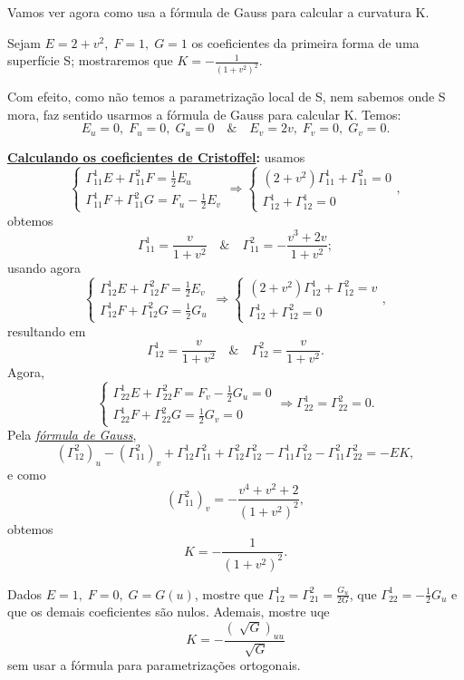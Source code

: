 \documentclass[../differential_geometry.tex]{subfiles}
\begin{document}
Vamos ver agora como usa a fórmula de Gauss para calcular a curvatura K.
\begin{example}
	Sejam \(E=2+v^{2},\; F = 1,\; G=1\) os coeficientes da primeira forma de uma superfície S; mostraremos que \(K = - \frac{1}{(1+v^{2})^{2}}\).

	Com efeito, como não temos a parametrização local de S, nem sabemos onde S mora, faz sentido usarmos a fórmula de Gauss para calcular K. Temos:
	\[
		E_{u}=0,\; F_{u}=0,\; G_{u}=0 \quad\&\quad E_{v}=2v,\; F_{v}=0,\; G_{v}=0.
	\]

	\textbf{\underline{Calculando os coeficientes de Cristoffel}:} usamos
	\[
		\left\{\begin{array}{ll}
			\Gamma_{11}^{1}E + \Gamma_{11}^{2}F = \frac{1}{2}E_{u} \\
			\Gamma_{11}^{1}F + \Gamma_{11}^{2}G = F_{u}-\frac{1}{2}E_{v}
		\end{array}\right.\Rightarrow \left\{\begin{array}{ll}
			(2+v^{2})\Gamma_{11}^{1} + \Gamma_{11}^{2} = 0 \\
			\Gamma_{12}^{1} + \Gamma_{12}^{1}=0
		\end{array}\right.,
	\]
	obtemos
	\[
		\Gamma_{11}^{1} = \frac{v}{1+v^{2}} \quad\&\quad \Gamma_{11}^{2} = -\frac{v^{3}+2v}{1+v^{2}};
	\]
	usando agora
	\[
		\left\{\begin{array}{ll}
			\Gamma_{12}^{1}E + \Gamma_{12}^{2} F = \frac{1}{2}E_{v} \\
			\Gamma_{12}^{1}F + \Gamma_{12}^{2}G = \frac{1}{2}G_{u}
		\end{array}\right. \Rightarrow \left\{\begin{array}{ll}
			(2+v^{2})\Gamma_{12}^{1} + \Gamma_{12}^{2} = v \\
			\Gamma_{12}^{1} + \Gamma_{12}^{2}=0
		\end{array}\right.,
	\]
	resultando em
	\[
		\Gamma_{12}^{1} = \frac{v}{1+v^{2}} \quad\&\quad \Gamma_{12}^{2}=\frac{v}{1+v^{2}}.
	\]
	Agora,
	\[
		\left\{\begin{array}{ll}
			\Gamma_{22}^{1}E + \Gamma_{22}^{2}F = F_{v} - \frac{1}{2}G_{u} = 0 \\
			\Gamma_{22}^{1}F + \Gamma_{22}^{2}G = \frac{1}{2}G_{v} = 0
		\end{array}\right.\Rightarrow \Gamma_{22}^{1} = \Gamma_{22}^{2}=0.
	\]
	Pela \hyperlink{gauss_formula}{\textit{fórmula de Gauss}},
	\[
		(\Gamma_{12}^{2})_{u} - (\Gamma_{11}^{2})_{v} + \Gamma_{12}^{1}\Gamma _{11}^{2} + \Gamma_{12}^{2}\Gamma_{12}^{2} - \Gamma_{11}^{1}\Gamma_{12}^{2}-\Gamma_{11}^{2} \Gamma_{22}^{2}=-EK,
	\]
	e como
	\[
		(\Gamma_{11}^{2})_{v}=-\frac{v^{4}+v^{2}+2}{(1+v^{2})^{2}},
	\]
	obtemos
	\[
		K= - \frac{1}{(1+v^{2})^{2}}.
	\]
\end{example}
\begin{exr}
	Dados \(E=1,\; F=0,\; G=G(u)\), mostre que \(\Gamma_{12}^{1} = \Gamma_{21}^{2} = \frac{G_{u}}{2G}\), que \(\Gamma_{22}^{1} = -\frac{1}{2}G_{u}\) e que os demais coeficientes são nulos. Ademais, mostre uqe
	\[
		K = -\frac{(\sqrt[]{G})_{uu}}{\sqrt[]{G}}
	\]
	sem usar a fórmula para parametrizações ortogonais.
\end{exr}
\end{document}
